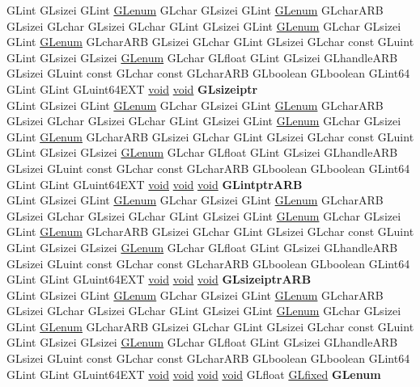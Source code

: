 \begin{DoxyCompactItemize}
\begin{tabbing}
\>GLint GLsizei GLint \hyperlink{interfacevoid}{GLenum} GLchar GLsizei GLint \hyperlink{interfacevoid}{GLenum} GLcharARB GLsizei GLchar GLsizei GLchar GLint GLsizei GLint \hyperlink{interfacevoid}{GLenum} GLchar GLsizei GLint \hyperlink{interfacevoid}{GLenum} GLcharARB GLsizei GLchar GLint GLsizei GLchar const GLuint GLint GLsizei GLsizei \hyperlink{interfacevoid}{GLenum} GLchar GLfloat GLint GLsizei GLhandleARB GLsizei GLuint const GLchar const GLcharARB GLboolean GLboolean GLint64 GLint GLint GLuint64EXT \hyperlink{interfacevoid}{void} \hyperlink{interfacevoid}{void} {\bfseries GLsizeiptr}\\
\>GLint GLsizei GLint \hyperlink{interfacevoid}{GLenum} GLchar GLsizei GLint \hyperlink{interfacevoid}{GLenum} GLcharARB GLsizei GLchar GLsizei GLchar GLint GLsizei GLint \hyperlink{interfacevoid}{GLenum} GLchar GLsizei GLint \hyperlink{interfacevoid}{GLenum} GLcharARB GLsizei GLchar GLint GLsizei GLchar const GLuint GLint GLsizei GLsizei \hyperlink{interfacevoid}{GLenum} GLchar GLfloat GLint GLsizei GLhandleARB GLsizei GLuint const GLchar const GLcharARB GLboolean GLboolean GLint64 GLint GLint GLuint64EXT \hyperlink{interfacevoid}{void} \hyperlink{interfacevoid}{void} \hyperlink{interfacevoid}{void} {\bfseries GLintptrARB}\\
\>GLint GLsizei GLint \hyperlink{interfacevoid}{GLenum} GLchar GLsizei GLint \hyperlink{interfacevoid}{GLenum} GLcharARB GLsizei GLchar GLsizei GLchar GLint GLsizei GLint \hyperlink{interfacevoid}{GLenum} GLchar GLsizei GLint \hyperlink{interfacevoid}{GLenum} GLcharARB GLsizei GLchar GLint GLsizei GLchar const GLuint GLint GLsizei GLsizei \hyperlink{interfacevoid}{GLenum} GLchar GLfloat GLint GLsizei GLhandleARB GLsizei GLuint const GLchar const GLcharARB GLboolean GLboolean GLint64 GLint GLint GLuint64EXT \hyperlink{interfacevoid}{void} \hyperlink{interfacevoid}{void} \hyperlink{interfacevoid}{void} {\bfseries GLsizeiptrARB}\\
\>GLint GLsizei GLint \hyperlink{interfacevoid}{GLenum} GLchar GLsizei GLint \hyperlink{interfacevoid}{GLenum} GLcharARB GLsizei GLchar GLsizei GLchar GLint GLsizei GLint \hyperlink{interfacevoid}{GLenum} GLchar GLsizei GLint \hyperlink{interfacevoid}{GLenum} GLcharARB GLsizei GLchar GLint GLsizei GLchar const GLuint GLint GLsizei GLsizei \hyperlink{interfacevoid}{GLenum} GLchar GLfloat GLint GLsizei GLhandleARB GLsizei GLuint const GLchar const GLcharARB GLboolean GLboolean GLint64 GLint GLint GLuint64EXT \hyperlink{interfacevoid}{void} \hyperlink{interfacevoid}{void} \hyperlink{interfacevoid}{void} \hyperlink{interfacevoid}{void} GLfloat \hyperlink{glheader_8h_ad6d3fa892df40dedf48ee6d84529ae5e}{GLfixed} {\bfseries GLenum}\\

\end{tabbing}
\end{DoxyCompactItemize}
